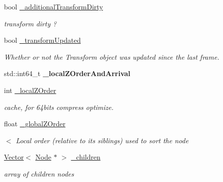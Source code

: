 \begin{DoxyCompactItemize}
\mbox{\label{classNode_a55fac06291e49b4bec15a14032b9e6a5}} 
bool \hyperlink{classNode_a55fac06291e49b4bec15a14032b9e6a5}{\+\_\+additional\+Transform\+Dirty}
\begin{DoxyCompactList}\small\item\em transform dirty ? \end{DoxyCompactList}\item 
\mbox{\label{classNode_a0af6bdab7557f0e7df90d74d7c217997}} 
bool \hyperlink{classNode_a0af6bdab7557f0e7df90d74d7c217997}{\+\_\+transform\+Updated}
\begin{DoxyCompactList}\small\item\em Whether or not the Transform object was updated since the last frame. \end{DoxyCompactList}\item 
\mbox{\label{classNode_a4140ffa6469a9940e8fdf5e8170ebba7}} 
std\+::int64\+\_\+t {\bfseries \+\_\+local\+Z\+Order\+And\+Arrival}
\item 
\mbox{\label{classNode_acd2322ede4846f7dec8e8202587985a9}} 
int \hyperlink{classNode_acd2322ede4846f7dec8e8202587985a9}{\+\_\+local\+Z\+Order}
\begin{DoxyCompactList}\small\item\em cache, for 64bits compress optimize. \end{DoxyCompactList}\item 
float \hyperlink{classNode_ada8c37d773103afb51bd5ca06bdb42b2}{\+\_\+global\+Z\+Order}
\begin{DoxyCompactList}\small\item\em $<$ Local order (relative to its siblings) used to sort the node \end{DoxyCompactList}\item 
\mbox{\label{classNode_a04befb78cbf7f5fd3a8d6d18425d21b3}} 
\hyperlink{classVector}{Vector}$<$ \hyperlink{classNode}{Node} $\ast$ $>$ \hyperlink{classNode_a04befb78cbf7f5fd3a8d6d18425d21b3}{\+\_\+children}
\begin{DoxyCompactList}\small\item\em array of children nodes \end{DoxyCompactList}\item 
\mbox{\label{classNode_af296e261174980bbffee33e800a855e1}} 

\end{DoxyCompactItemize}
